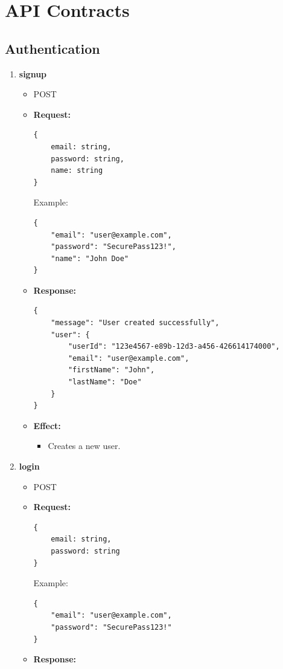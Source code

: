 \documentclass[12pt, a4paper]{article}
\begin{document}
\section{API Contracts}

\subsection{Authentication}
\begin{enumerate}
    \item \textbf{signup}
    \begin{itemize}
        \item POST 
        \item \textbf{Request:}
        \begin{verbatim}
{
    email: string,
    password: string,
    name: string
}
        \end{verbatim}
        Example:
        \begin{verbatim}
{
    "email": "user@example.com",
    "password": "SecurePass123!",
    "name": "John Doe"
}
        \end{verbatim}
        \item \textbf{Response:}
        \begin{verbatim}
{
    "message": "User created successfully",
    "user": {
        "userId": "123e4567-e89b-12d3-a456-426614174000",
        "email": "user@example.com",
        "firstName": "John",
        "lastName": "Doe"
    }
}
        \end{verbatim}
        \item \textbf{Effect:}
        \begin{itemize}
            \item Creates a new user.
        \end{itemize}
    \end{itemize}
    \item \textbf{login}
    \begin{itemize}
        \item POST 
        \item \textbf{Request:}
        \begin{verbatim}
{
    email: string,
    password: string
}
        \end{verbatim}
        Example:
        \begin{verbatim}
{
    "email": "user@example.com",
    "password": "SecurePass123!"
}
        \end{verbatim}
        \item \textbf{Response:}

\end{itemize}
\end{enumerate}
\end{document}
